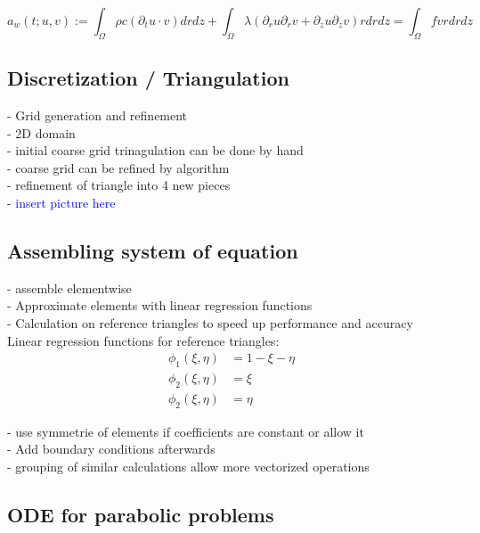 \documentclass[parskip=half, titlepage=yes, 12pt, BCOR=12mm, DIV=calc]{scrartcl}
\begin{document}
\begin{equation}
    a_w(t;u,v) := \int_{\Omega} \rho c (\partial_t u \cdot v) drdz + \int_{\Omega} \lambda (\partial_r u \partial_r v + \partial_z u \partial_z v) r drdz = \int_{\Omega} f v r dr dz
\end{equation}

\newpage


\subsection{Discretization / Triangulation}

- Grid generation and refinement \\
- 2D domain \\
- initial coarse grid trinagulation can be done by hand \\
- coarse grid can be refined by algorithm \\

- refinement of triangle into 4 new pieces \\
- \textcolor{blue}{insert picture here}

\subsection{Assembling system of equation}

- assemble elementwise \\
- Approximate elements with linear regression functions\\
- Calculation on reference triangles to speed up performance and accuracy \\

Linear regression functions for reference triangles:
\begin{align}
    \phi_1(\xi, \eta) &= 1 - \xi - \eta \\
    \phi_2(\xi, \eta) &= \xi \\
    \phi_2(\xi, \eta) &= \eta 
\end{align}

- use symmetrie of elements if coefficients are constant or allow it \\
- Add boundary conditions afterwards \\
- grouping of similar calculations allow more vectorized operations \\ 

\subsection{ODE for parabolic problems}
\end{document}
